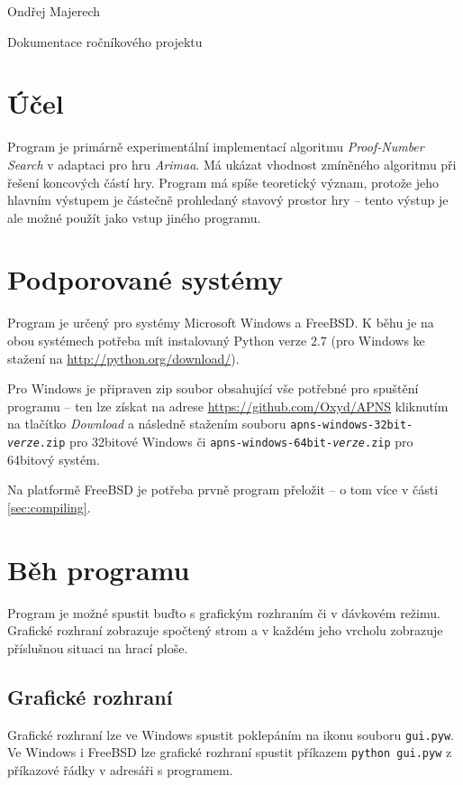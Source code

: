\documentclass{article}
\begin{document}
\begin{flushright}
  Ondřej Majerech
\end{flushright}
\begin{center}
  \Huge Dokumentace ročníkového projektu
\end{center}

\section{Účel}
Program je primárně experimentální implementací algoritmu \emph{Proof-Number Search} v adaptaci pro hru \emph{Arimaa}.
Má ukázat vhodnost zmíněného algoritmu při řešení koncových částí hry. Program má spíše teoretický význam, protože jeho
hlavním výstupem je částečně prohledaný stavový prostor hry -- tento výstup je ale možné použít jako vstup jiného
programu.

\section{Podporované systémy}
Program je určený pro systémy Microsoft Windows a FreeBSD. K běhu je na obou systémech potřeba mít instalovaný
Python verze 2.7 (pro Windows ke stažení na \url{http://python.org/download/}). 

Pro Windows je připraven zip soubor obsahující vše potřebné pro spuštění programu -- ten lze získat na adrese
\url{https://github.com/Oxyd/APNS} kliknutím na tlačítko \emph{Download} a následně stažením souboru
\texttt{apns-windows-32bit-\textit{verze}.zip} pro 32bitové Windows či \texttt{apns-windows-64bit-\textit{verze}.zip} pro 
64bitový systém.

Na platformě FreeBSD je potřeba prvně program přeložit -- o tom více v části \ref{sec:compiling}.

\section{Běh programu}
\label{sec:running}
Program je možné spustit buďto s grafickým rozhraním či v dávkovém režimu. Grafické rozhraní zobrazuje spočtený strom a
v každém jeho vrcholu zobrazuje příslušnou situaci na hrací ploše. 

\subsection{Grafické rozhraní}
Grafické rozhraní lze ve Windows spustit poklepáním na ikonu souboru \texttt{gui.pyw}. Ve Windows i FreeBSD lze grafické
rozhraní spustit příkazem \texttt{python gui.pyw} z příkazové řádky v adresáři s programem.
\end{document}
